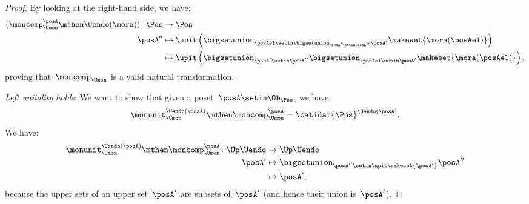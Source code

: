 \begin{proof}
    By looking at the right-hand side, we have:
    \begin{equation}
        \begin{aligned}
            (\moncomp_{\Umon}^\posA \mthen \Uendo(\mora))
            \colon \Pos & \to \Pos \\
            \posA''     & \mapsto \upit \left( \bigsetunion_{\posAel \setin \bigsetunion_{\posA'\setin \posA''}\posA'} \makeset{ \mora(\posAel)}\right) \\
                        & \mapsto \upit \left( \bigsetunion_{\posA'\setin \posA''}\bigsetunion_{\posAel \setin \posA'}\makeset{\mora(\posAel)}\right),
        \end{aligned}
    \end{equation}
    proving that~$\moncomp_{\Umon}$ is a valid natural transformation.

    \emph{Left unitality holds}: We want to show that given a poset~$\posA\setin \Ob_\Pos$, we have:
    \begin{equation}
        \monunit_{\Umon}^{\Uendo(\posA)}\mthen \moncomp_{\Umon}^{\posA}=\catidat{\Pos}^{\Uendo(\posA)}.
    \end{equation}
    We have:
    \begin{equation}
        \begin{aligned}
            \monunit_{\Umon}^{\Uendo(\posA)}\mthen \moncomp_{\Umon}^{\posA}\colon \Up \Uendo & \to \Up \Uendo \\
            \posA'                                                                           & \mapsto \bigsetunion_{\posA''\setin \upit \makeset{ \posA'}} \posA'' \\
                                                                                             & \mapsto \posA',
        \end{aligned}
    \end{equation}
    because the upper sets of an upper set~$\posA'$ are subsets of~$\posA'$ (and hence their union is~$\posA'$).


\end{proof}
